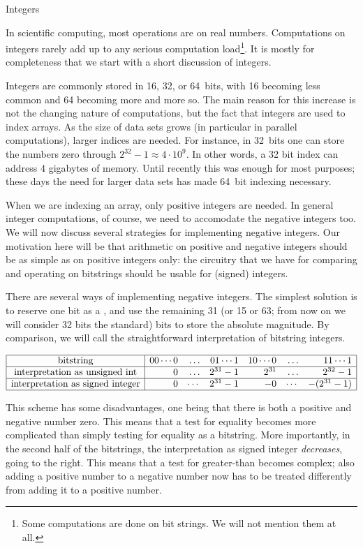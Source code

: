  {Integers}

In scientific computing, most operations are on real
numbers. Computations on integers rarely add up to any serious
computation load\footnote{Some computations are done on bit
  strings. We will not mention them at all.}. It is mostly for
completeness that we start with a short discussion of integers.

Integers are commonly stored in 16, 32, or 64~bits, with 16 becoming
less common and 64 becoming more and more so. The main reason for this increase is
not the changing nature of computations, but the fact that integers
are used to index arrays. As the size of data sets grows (in
particular in parallel computations), larger indices are needed. For
instance, in 32~bits one can store the numbers zero through
$2^{32}-1\approx 4\cdot 10^9$. In other words, a 32 bit index can
address 4 gigabytes of memory. Until recently this was enough for most
purposes; these days the need for larger data sets has made 64~bit
indexing necessary.

When we are indexing an array, only positive integers are needed.
In general integer computations, of course, we need to accomodate
the negative integers too. We will now discuss several strategies for
implementing negative integers. Our motivation here will be that
arithmetic on positive and negative integers should be as simple as on
positive integers only: the circuitry that we have for comparing and
operating on bitstrings should be usable for (signed) integers.

There are several ways of implementing
negative integers. The simplest solution is to reserve one bit as a
, and use the remaining 31 (or 15 or 63; from now on we will
consider 32 bits the standard) bits to store the
absolute magnitude. By comparison, we will call the straightforward
interpretation of bitstring  integers.

\[
\begin{array}{|c|rrrrrr|}
  \hline
  \hbox{bitstring}&
  00\cdots0&\ldots&01\cdots1&
  10\cdots0&\ldots&11\cdots1\\ \hline
  \hbox{interpretation as unsigned int}&
  0&\ldots&2^{31}-1&
  2^{31}&\ldots&2^{32}-1\\ \hline
  \hbox{interpretation as signed integer}&
  0&\cdots&2^{31}-1&
  -0&\cdots&-(2^{31}-1)\\
  \hline
\end{array}
\]

This scheme has some disadvantages, one being that
there is both a positive and negative number zero. This means that a test
for equality becomes more complicated than simply testing for equality
as a bitstring. More importantly, in the second half of the
bitstrings, the interpretation as signed integer \emph{decreases},
going to the right. This means that a test for greater-than becomes
complex; also
adding a positive number to a
negative number now has to be treated differently from adding it to a
positive number.

